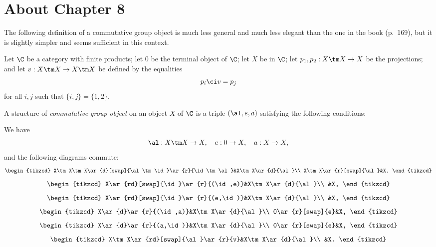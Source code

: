 \documentclass[12pt]{article}
\theoremstyle{remark}
\theoremstyle{definition}
\begin{document}

\section{About Chapter 8} 


The following definition of a commutative group object is much less general and much less elegant than the one in the book (p.~169), but it is slightly simpler and seems sufficient in this context. 

Let $\C$ be a category with finite products; let $0$ be the terminal object of $\C$; let $X$ be in $\C$; let $p_1,p_2:X\tm X\to X$ be the projections; and let $v:X\tm X\to X\tm X$ be defined by the equalities 
$$
p_i\ci v=p_j
$$ 
for all $i,j$ such that $\{i,j\}=\{1,2\}$. 

A structure of \emph{commutative group object} on an object $X$ of $\C$ is a triple $(\al,e,a)$ satisfying the following conditions:

We have 
$$
\al:X\tm X\to X,\quad e:0\to X,\quad a:X\to X,
$$ 
and the following diagrams commute:
$$
\begin{tikzcd}
X\tm X\tm X\ar{d}[swap]{\al\tm\id}\ar{r}{\id\tm\al}&X\tm X\ar{d}{\al}\\ 
X\tm X\ar{r}[swap]{\al}&X,
\end{tikzcd}
$$ 
$$
\begin{tikzcd}
X\ar{rd}[swap]{\id}\ar{r}{(\id,e)}&X\tm X\ar{d}{\al}\\ 
&X,
\end{tikzcd}
$$ 
$$
\begin{tikzcd}
X\ar{rd}[swap]{\id}\ar{r}{(e,\id)}&X\tm X\ar{d}{\al}\\ 
&X,
\end{tikzcd}
$$
$$
\begin{tikzcd}
X\ar{d}\ar{r}{(\id,a)}&X\tm X\ar{d}{\al}\\ 
0\ar{r}[swap]{e}&X,
\end{tikzcd}
$$
$$
\begin{tikzcd}
X\ar{d}\ar{r}{(a,\id)}&X\tm X\ar{d}{\al}\\ 
0\ar{r}[swap]{e}&X,
\end{tikzcd}
$$ 
$$
\begin{tikzcd}
X\tm X\ar{rd}[swap]{\al}\ar{r}{v}&X\tm X\ar{d}{\al}\\ 
&X.
\end{tikzcd}
$$ 


\end{document}
